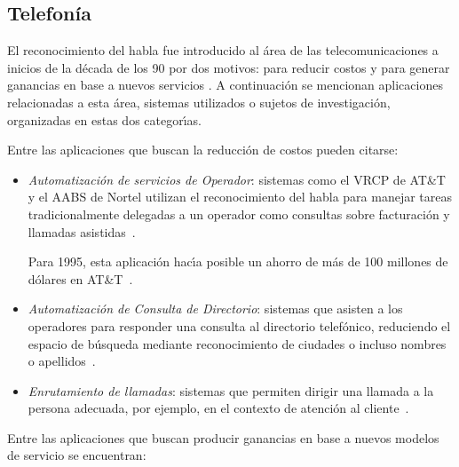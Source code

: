 \subsection{Telefon\'ia}
\label{sec:telefonia}

El reconocimiento del habla fue introducido al \'area de las telecomunicaciones a inicios de la d\'ecada
de los 90 por dos motivos: para reducir costos y para generar ganancias en base a nuevos servicios \cite{RabinerApplications1997}.
A continuaci\'on se mencionan aplicaciones relacionadas a esta \'area, sistemas utilizados o sujetos de investigaci\'on, 
organizadas en estas dos categor{\'\i}as. 

Entre las aplicaciones que buscan la reducci\'on de costos pueden citarse:

\begin{itemize}
	\item  \emph{Automatizaci\'on de servicios de Operador}: sistemas como el VRCP de AT\&T 
	y el AABS de Nortel utilizan el reconocimiento del habla para manejar tareas tradicionalmente delegadas
	a un operador como consultas sobre facturaci\'on y llamadas \mbox{asistidas \cite{RabinerApplications1997}}.

	Para 1995, esta aplicaci\'on hac{\'\i}a posible un ahorro de m\'as de 100 millones de d\'olares 
	en \mbox{AT\&T \cite{WilponApplications1994}}.

	\item \emph{Automatizaci\'on de Consulta de Directorio}: sistemas que asisten a los operadores
	para responder una consulta al directorio telef\'onico, reduciendo el espacio de b\'usqueda mediante
	reconocimiento de ciudades o incluso nombres o \mbox{apellidos \cite{RabinerApplications1997}}.

	\item \emph{Enrutamiento de llamadas}: sistemas que permiten dirigir una llamada a la persona adecuada,
	por ejemplo, en el contexto de atenci\'on al \mbox{cliente \cite{Sachs97howmay}}.
\end{itemize}

Entre las aplicaciones que buscan producir ganancias en base a nuevos modelos de servicio se encuentran:

